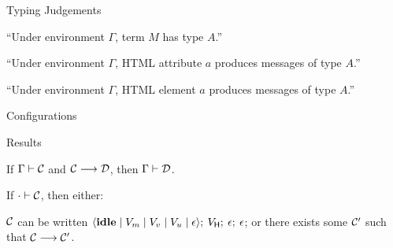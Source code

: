 \documentclass[11.5pt, aspectratio=169]{beamer}
\begin{document}
\begin{frame}{Typing Judgements}

  \begin{center}
  {\Huge {}}
  \vspace{0.5em}

    ``Under environment $\Gamma$, term $M$ has type $A$.''
  \end{center}
  \vspace{1em}

  \begin{center}
  {\Huge {}}
  \vspace{0.5em}

    ``Under environment $\Gamma$, HTML attribute $a$ produces messages of type $A$.''
  \end{center}
  \vspace{1em}

  \begin{center}
  {\Huge {}}
  \vspace{0.5em}

    ``Under environment $\Gamma$, HTML element $a$ produces messages of type $A$.''
  \end{center}
\end{frame}

\begin{frame}{Configurations}
\end{frame}

\begin{frame}{Results}

\begin{theorem}
  \label{thm:config-pres}
  If $\Gamma \vdash \mathcal{C}$ and $\mathcal{C} \longrightarrow \mathcal{D}$, then $\Gamma \vdash \mathcal{D}$.
\end{theorem}
%
\vspace{2em}
%
  \begin{theorem}\label{thm:event-progress}
    If $\cdot \vdash \mathcal{C}$, then either:
    \begin{itemize}
      \itemR $\mathcal{C}$ can be written $\langle \mathbf{\mathbf{idle}} \mid V_m \mid V_v \mid V_u \mid \epsilon \rangle ;\: V_{\textsf{H}} ;\: \epsilon ;\: \epsilon$; or
      \itemR there exists some $\mathcal{C}'$ such that $\mathcal{C} \longrightarrow \mathcal{C'}$.
      \end{itemize}
  \end{theorem}
\end{frame}
\end{document}
